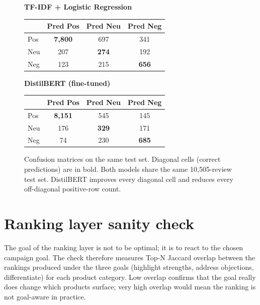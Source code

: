 \documentclass[12pt,a4paper]{report}
\begin{document}
\begin{figure}[ht!]
  \centering
  \begin{minipage}{0.48\textwidth}
    \centering
    \textbf{TF-IDF + Logistic Regression}\\[6pt]
    \begin{tabular}{@{}lccc@{}}
      \toprule
       & Pred Pos & Pred Neu & Pred Neg \\
      \midrule
      Pos & \textbf{7,800} & 697 & 341 \\
      Neu & 207 & \textbf{274} & 192 \\
      Neg & 123 & 215 & \textbf{656} \\
      \bottomrule
    \end{tabular}
  \end{minipage}
  \hfill
  \begin{minipage}{0.48\textwidth}
    \centering
    \textbf{DistilBERT (fine-tuned)}\\[6pt]
    \begin{tabular}{@{}lccc@{}}
      \toprule
       & Pred Pos & Pred Neu & Pred Neg \\
      \midrule
      Pos & \textbf{8,151} & 545 & 145 \\
      Neu & 176 & \textbf{329} & 171 \\
      Neg & 74 & 230 & \textbf{685} \\
      \bottomrule
    \end{tabular}
  \end{minipage}
  \caption{Confusion matrices on the same test set. Diagonal cells (correct predictions) are in bold. Both models share the same 10,505-review test set. DistilBERT improves every diagonal cell and reduces every off-diagonal positive-row count.}
  \label{fig:confusion}
\end{figure}

\section{Ranking layer sanity check}
\label{sec:rankcheck}

The goal of the ranking layer is not to be optimal; it is to react to the chosen campaign goal. The check therefore measures Top-N Jaccard overlap between the rankings produced under the three goals (highlight strengths, address objections, differentiate) for each product category. Low overlap confirms that the goal really does change which products surface; very high overlap would mean the ranking is not goal-aware in practice.
\end{document}
